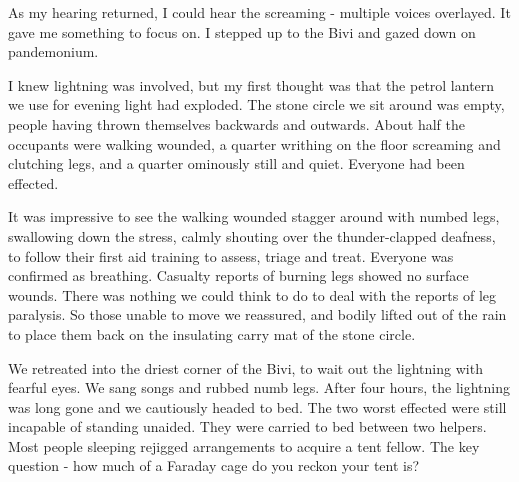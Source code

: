 As my hearing returned, I could hear the screaming - multiple voices overlayed. It gave me something to focus on. I stepped up to the Bivi and gazed down on pandemonium. 

I knew lightning was involved, but my first thought was that the petrol lantern we use for evening light had exploded. The stone circle we sit around was empty, people having thrown themselves backwards and outwards. About half the occupants were walking wounded, a quarter writhing on the floor screaming and clutching legs, and a quarter ominously still and quiet. Everyone had been effected.


It was impressive to see the walking wounded stagger around with numbed legs, swallowing down the stress, calmly shouting over the thunder-clapped deafness, to follow their first aid training to assess, triage and treat. Everyone was confirmed as breathing. Casualty reports of burning legs showed no surface wounds. There was nothing we could think to do to deal with the reports of leg paralysis. So those unable to move we reassured, and bodily lifted out of the rain to place them back on the insulating carry mat of the stone circle. 

We retreated into the driest corner of the Bivi, to wait out the lightning with fearful eyes. We sang songs and rubbed numb legs. After four hours, the lightning was long gone and we cautiously headed to bed. The two worst effected were still incapable of standing unaided. They were carried to bed between two helpers. Most people sleeping rejigged arrangements to acquire a tent fellow. The key question - how much of a Faraday cage do you reckon your tent is?

